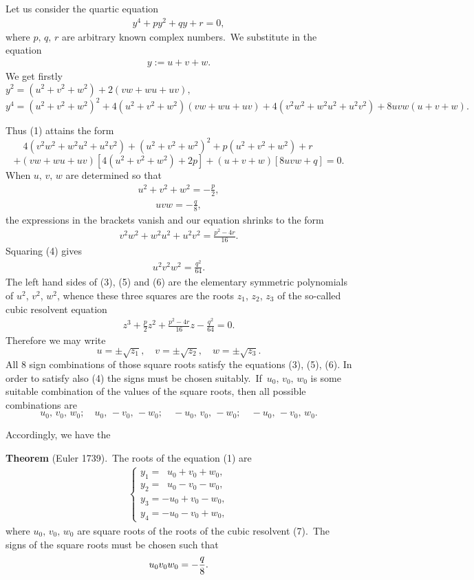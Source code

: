 \documentclass[12pt]{article}
\theoremstyle{definition}
\begin{document}
Let us consider the quartic equation
\begin{align}
y^4+py^2+qy+r = 0,
\end{align}
where $p,\,q,\,r$ are arbitrary known complex numbers.\, We substitute in the equation
\begin{align}
y := u+v+w.
\end{align}
We get firstly\\
$y^2 = (u^2+v^2+w^2)+2(vw+wu+uv),$\\
$y^4 = (u^2+v^2+w^2)^2+4(u^2+v^2+w^2)(vw+wu+uv)+4(v^2w^2+w^2u^2+u^2v^2)+8uvw(u+v+w).$

Thus (1) attains the form 
$$4(v^2w^2+w^2u^2+u^2v^2)+(u^2+v^2+w^2)^2+p(u^2+v^2+w^2)+r \qquad\;$$
$$+(vw+wu+uv)[4(u^2+v^2+w^2)+2p]+(u+v+w)[8uvw+q] = 0.$$
When $u,\,v,\,w$ are determined so that
\begin{align}
u^2+v^2+w^2 = -\frac{p}{2},
\end{align}
\begin{align}
uvw = -\frac{q}{8},
\end{align}
the expressions in the brackets vanish and our equation shrinks to the form
\begin{align}
v^2w^2+w^2u^2+u^2v^2 = \frac{p^2-4r}{16}.
\end{align}
Squaring (4) gives
\begin{align}
u^2v^2w^2 = \frac{q^2}{64}.
\end{align}
The left hand sides of (3), (5) and (6) are the elementary symmetric polynomials of $u^2$, $v^2$, $w^2$, whence these three squares are the roots $z_1$, $z_2$, $z_3$ of the so-called cubic resolvent equation
\begin{align}
z^3+\frac{p}{2}z^2+\frac{p^2-4r}{16}z-\frac{q^2}{64} = 0.
\end{align}
Therefore we may write
$$u = \pm\sqrt{z_1}, \quad v = \pm\sqrt{z_2}, \quad w = \pm\sqrt{z_3}.$$
All 8 sign combinations of those square roots satisfy the equations (3), (5), (6).  In order to satisfy also (4) the signs must be chosen suitably.\, If\, $u_0,\,v_0,\,w_0$ is some suitable combination of the values of the square roots, then all possible combinations are
$$u_0,\,v_0,\,w_0;\quad u_0,\,-v_0,\,-w_0;\quad -u_0,\,v_0,\,-w_0;\quad -u_0,\,-v_0,\,w_0.$$ 

Accordingly, we have the 

\textbf{Theorem} (Euler 1739).\, The roots of the equation (1) are
\begin{align}
\begin{cases}
y_1 = \;\;u_0+v_0+w_0,\\
y_2 = \;\;u_0-v_0-w_0,\\
y_3 = -u_0+v_0-w_0,\\
y_4 = -u_0-v_0+w_0,
\end{cases}
\end{align}
where $u_0,\,v_0,\,w_0$ are square roots of the roots of the cubic resolvent (7).\, The signs of the square roots must be chosen such that 
$$u_0v_0w_0 = -\frac{q}{8}.\\$$
\end{document}
